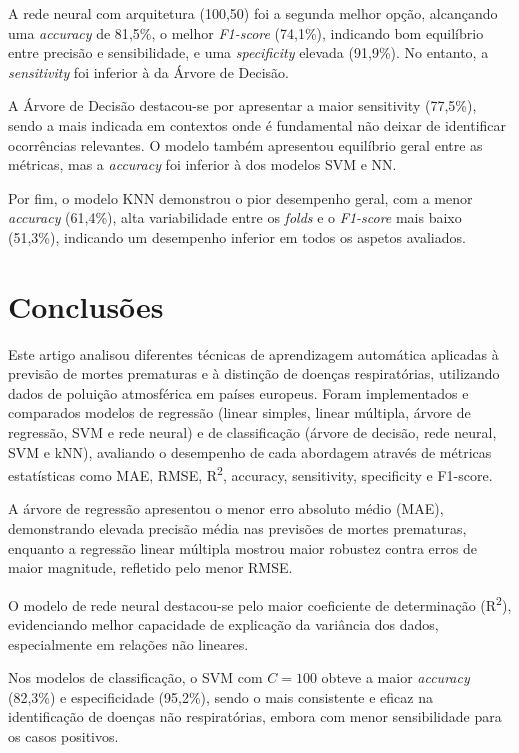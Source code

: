 \documentclass[conference]{IEEEtran}
\begin{document}
A rede neural com arquitetura (100,50) foi a segunda melhor opção, alcançando uma \textit{accuracy} de 81{,}5\%, o melhor \textit{F1-score} (74{,}1\%), indicando bom equilíbrio entre precisão e sensibilidade, e uma \textit{specificity} elevada (91{,}9\%). No entanto, a \textit{sensitivity} foi inferior à da Árvore de Decisão.

A Árvore de Decisão destacou-se por apresentar a maior sensitivity (77{,}5\%), sendo a mais indicada em contextos onde é fundamental não deixar de identificar ocorrências relevantes. O modelo também apresentou equilíbrio geral entre as métricas, mas a \textit{accuracy} foi inferior à dos modelos SVM e NN.

Por fim, o modelo KNN demonstrou o pior desempenho geral, com a menor \textit{accuracy} (61{,}4\%), alta variabilidade entre os \textit{folds} e o \textit{F1-score} mais baixo (51{,}3\%), indicando um desempenho inferior em todos os aspetos avaliados.

\section*{Conclusões}

Este artigo analisou diferentes técnicas de aprendizagem automática aplicadas à previsão de mortes prematuras e à distinção de doenças respiratórias, utilizando dados de poluição atmosférica em países europeus. Foram implementados e comparados modelos de regressão (linear simples, linear múltipla, árvore de regressão, SVM e rede neural) e de classificação (árvore de decisão, rede neural, SVM e kNN), avaliando o desempenho de cada abordagem através de métricas estatísticas como MAE, RMSE, R\textsuperscript{2}, accuracy, sensitivity, specificity e F1-score.

A árvore de regressão apresentou o menor erro absoluto médio (MAE), demonstrando elevada precisão média nas previsões de mortes prematuras, enquanto a regressão linear múltipla mostrou maior robustez contra erros de maior magnitude, refletido pelo menor RMSE.

O modelo de rede neural destacou-se pelo maior coeficiente de determinação (R\textsuperscript{2}), evidenciando melhor capacidade de explicação da variância dos dados, especialmente em relações não lineares.

Nos modelos de classificação, o SVM com $C=100$ obteve a maior \textit{accuracy} (82,3\%) e especificidade (95,2\%), sendo o mais consistente e eficaz na identificação de doenças não respiratórias, embora com menor sensibilidade para os casos positivos.
\end{document}
